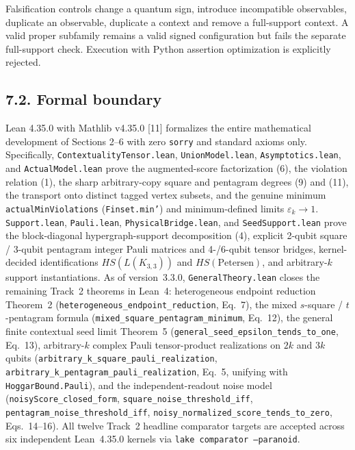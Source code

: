 \documentclass[10pt,a4paper]{article}
\begin{document}
Falsification controls change a quantum sign, introduce incompatible observables, duplicate an observable, duplicate a context and remove a full-support context. A valid proper subfamily remains a valid signed configuration but fails the separate full-support check. Execution with Python assertion optimization is explicitly rejected.

\subsection{7.2. Formal boundary}\label{formal-boundary}

Lean 4.35.0 with Mathlib v4.35.0 {[}11{]} formalizes the entire mathematical development of Sections 2--6 with zero \texttt{sorry} and standard axioms only. Specifically, \texttt{ContextualityTensor.lean}, \texttt{UnionModel.lean}, \texttt{Asymptotics.lean}, and \texttt{ActualModel.lean} prove the augmented-score factorization (6), the violation relation (1), the sharp arbitrary-copy square and pentagram degrees (9) and (11), the transport onto distinct tagged vertex subsets, and the genuine minimum \texttt{actualMinViolations} (\texttt{Finset.min'}) and minimum-defined limits \(\varepsilon_k \to 1\). \texttt{Support.lean}, \texttt{Pauli.lean}, \texttt{PhysicalBridge.lean}, and \texttt{SeedSupport.lean} prove the block-diagonal hypergraph-support decomposition (4), explicit 2-qubit square / 3-qubit pentagram integer Pauli matrices and 4-/6-qubit tensor bridges, kernel-decided identifications \(HS(L(K_{3,3}))\) and \(HS(\mathrm{Petersen})\), and arbitrary-\(k\) support instantiations. As of version~3.3.0, \texttt{GeneralTheory.lean} closes the remaining Track~2 theorems in Lean~4: heterogeneous endpoint reduction Theorem~2 (\texttt{heterogeneous\_endpoint\_reduction}, Eq.~7), the mixed \(s\)-square / \(t\)-pentagram formula (\texttt{mixed\_square\_pentagram\_minimum}, Eq.~12), the general finite contextual seed limit Theorem~5 (\texttt{general\_seed\_epsilon\_tends\_to\_one}, Eq.~13), arbitrary-\(k\) complex Pauli tensor-product realizations on \(2k\) and \(3k\) qubits (\texttt{arbitrary\_k\_square\_pauli\_realization}, \texttt{arbitrary\_k\_pentagram\_pauli\_realization}, Eq.~5, unifying with \texttt{HoggarBound.Pauli}), and the independent-readout noise model (\texttt{noisyScore\_closed\_form}, \texttt{square\_noise\_threshold\_iff}, \texttt{pentagram\_noise\_threshold\_iff}, \texttt{noisy\_normalized\_score\_tends\_to\_zero}, Eqs.~14--16). All twelve Track~2 headline comparator targets are accepted across six independent Lean~4.35.0 kernels via \texttt{lake comparator --paranoid}.
\end{document}
